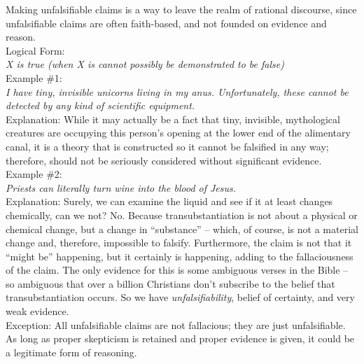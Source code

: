 \documentclass[a4paper,12pt,single,pdftex]{scrartcl}
\begin{document}
      
        Making unfalsifiable claims is a way to leave the realm of rational discourse, since unfalsifiable claims are often faith-based, and not founded on evidence and reason.
      \\

      
        Logical Form:
      \\

      
        {\em X is true (when X is cannot possibly be demonstrated to be false)}
      \\

      
        Example \#1:
      \\

      
        {\em I have tiny, invisible unicorns living in my anus.  Unfortunately, these cannot be detected by any kind of scientific equipment.}
      \\

      
        Explanation: While it may actually be a fact that tiny, invisible, mythological creatures are occupying this person’s opening at the lower end of the alimentary canal, it is a theory that is constructed so it cannot be falsified in any way; therefore, should not be seriously considered without significant evidence.
      \\

      
        Example \#2:
      \\

      
        {\em Priests can literally turn wine into the blood of Jesus.}
      \\

      
        Explanation: Surely, we can examine the liquid and see if it at least changes chemically, can we not?  No.  Because transubstantiation is not about a physical or chemical change, but a change in “substance” -- which, of course, is not a material change and, therefore, impossible to falsify.  Furthermore, the claim is not that it “might be” happening, but it certainly is happening, adding to the fallaciousness of the claim.  The only evidence for this is some ambiguous verses in the Bible -- so ambiguous that over a billion Christians don’t subscribe to the belief that transubstantiation occurs.  So we have {\it unfalsifiability}, belief of certainty, and very weak evidence.
      \\

      
        Exception: All unfalsifiable claims are not fallacious; they are just unfalsifiable.  As long as proper skepticism is retained and proper evidence is given, it could be a legitimate form of reasoning.
      \\
\end{document}

